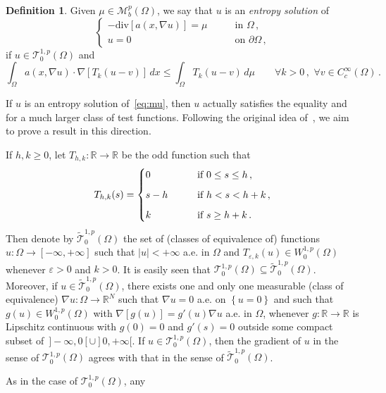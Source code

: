 \documentclass[twoside,reqno]{amsart}
\numberwithin{equation}{section}
\theoremstyle{definition}
\newtheorem{defn}[thm]{Definition}
\newcommand{\R}{\mathbb{R}}
\begin{document}
%
\begin{defn}
Given $\mu\in \mathcal{M}_b^p(\Omega)$, we say that $u$ is an
\emph{entropy solution} of
\begin{equation}
\label{eq:mu}
\begin{cases}
- \mathrm{div}[a(x,\nabla u)] = \mu
&\qquad\text{in $\Omega$}\,,\\
u=0
&\qquad\text{on $\partial\Omega$}\,,
\end{cases}
\end{equation}
if $u\in \mathcal{T}^{1,p}_0(\Omega)$ and
\[
\int_\Omega a(x,\nabla u)\cdot\nabla [T_k(u - v)]\,dx
\leq \int_\Omega T_k(u - v)\,d\mu
\qquad\forall k>0\,,\,\, \forall v\in C^{\infty}_c(\Omega)\,.
\]
\end{defn}
%
If $u$ is an entropy solution of~\eqref{eq:mu}, then $u$ actually
satisfies the equality and for a much larger class of test 
functions.
Following the original idea of~\cite{brezis_browder1978},
we aim to prove a result in this direction.
\par
If $h, k\geq 0$, let $T_{h,k}:\R\rightarrow\R$ be the odd function 
such that
\[
T_{h,k}(s) =
\begin{cases}
0 &\qquad\text{if $0\leq s \leq h$}\,,\\
\noalign{\medskip}
s-h &\qquad\text{if $h < s < h+k$}\,,\\
\noalign{\medskip}
k &\qquad\text{if $s \geq h+k$}\,.
\end{cases}
\]
Then denote by 
$\widetilde{\mathcal{T}}^{1,p}_0(\Omega)$ the set of (classes of 
equivalence of) functions $u:\Omega\rightarrow[-\infty,+\infty]$ 
such that $|u|<+\infty$ a.e. in $\Omega$ and 
$T_{\varepsilon,k}(u)\in W^{1,p}_0(\Omega)$ 
whenever $\varepsilon>0$ and $k>0$.
It is easily seen that 
$\mathcal{T}^{1,p}_0(\Omega)\subseteq 
\widetilde{\mathcal{T}}^{1,p}_0(\Omega)$.
Moreover, if $u\in \widetilde{\mathcal{T}}^{1,p}_0(\Omega)$, 
there exists one 
and only one measurable (class of equivalence)
$\nabla u:\Omega\rightarrow\R^N$ such that
$\nabla u=0$ a.e. on $\left\{u=0\right\}$ and such that
$g(u)\in W^{1,p}_0(\Omega)$ with
$\nabla[g(u)]=g'(u)\nabla u$ a.e. in $\Omega$,
whenever $g:\R\rightarrow\R$ is Lipschitz continuous with 
$g(0)=0$ and $g'(s)=0$ outside some compact subset 
of~$]-\infty,0[\cup]0,+\infty[$.
If $u\in \mathcal{T}^{1,p}_0(\Omega)$, then the gradient of $u$ 
in the sense of $\mathcal{T}^{1,p}_0(\Omega)$ agrees with that
in the sense of $\widetilde{\mathcal{T}}^{1,p}_0(\Omega)$.
\par
As in the case of $\mathcal{T}^{1,p}_0(\Omega)$, any
\end{document}
